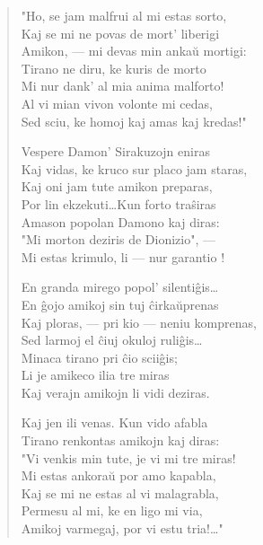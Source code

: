 \begin{verse}
                  "Ho, se jam malfrui al mi estas sorto,\\
                  Kaj se mi ne povas de mort' liberigi\\
                  Amikon, --- mi devas min anka\u u mortigi:\\
                  Tirano ne diru, ke kuris de morto\\
                  Mi nur dank' al mia anima malforto!\\
                  Al vi mian vivon volonte mi cedas,\\
                  Sed sciu, ke homoj kaj amas kaj kredas!"

                  Vespere Damon' Sirakuzojn eniras\\
                  Kaj vidas, ke kruco sur placo jam staras,\\
                  Kaj oni jam tute amikon preparas,\\
                  Por lin ekzekuti\dots Kun forto tra\^siras\\
                  Amason popolan Damono kaj diras:\\
                  "Mi morton deziris de Dionizio", ---\\
                  Mi estas krimulo, li --- nur garantio !

                  En granda mirego popol' silenti\^gis\dots\\
                  En \^gojo amikoj sin tuj \^cirka\u uprenas\\
                  Kaj ploras, --- pri kio --- neniu komprenas,\\
                  Sed larmoj el \^ciuj okuloj ruli\^gis\dots\\
                  Minaca tirano pri \^cio scii\^gis;\\
                  Li je amikeco ilia tre miras\\
                  Kaj verajn amikojn li vidi deziras.

                  Kaj jen ili venas. Kun vido afabla\\
                  Tirano renkontas amikojn kaj diras:\\
                  "Vi venkis min tute, je vi mi tre miras!\\
                  Mi estas ankora\u u por amo kapabla,\\
                  Kaj se mi ne estas al vi malagrabla,\\
                  Permesu al mi, ke en ligo mi via,\\
                  Amikoj varmegaj, por vi estu tria!\dots"

\end{verse}


\smallrule{}

